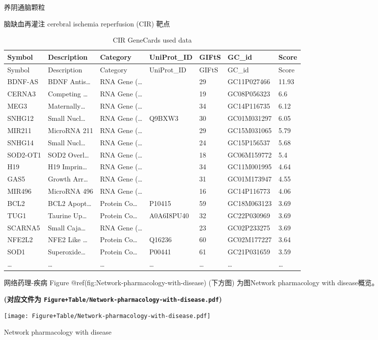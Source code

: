 \documentclass[
  ignorenonframetext,
]{beamer}
\begin{document}
\begin{frame}[fragile]{养阴通脑颗粒}
\begin{block}{脑缺血再灌注 cerebral ischemia reperfusion (CIR) 靶点}
\begin{longtable}[]{@{}lllllll@{}}
\caption{CIR GeneCards used data}\tabularnewline
\toprule
Symbol & Description & Category & UniProt\_ID & GIFtS & GC\_id &
Score\tabularnewline
\midrule
\endfirsthead
\toprule
Symbol & Description & Category & UniProt\_ID & GIFtS & GC\_id &
Score\tabularnewline
\midrule
\endhead
BDNF-AS & BDNF Antis\ldots{} & RNA Gene (\ldots{} & & 29 & GC11P027466 &
11.93\tabularnewline
CERNA3 & Competing \ldots{} & RNA Gene (\ldots{} & & 19 & GC08P056323 &
6.6\tabularnewline
MEG3 & Maternally\ldots{} & RNA Gene (\ldots{} & & 34 & GC14P116735 &
6.12\tabularnewline
SNHG12 & Small Nucl\ldots{} & RNA Gene (\ldots{} & Q9BXW3 & 30 &
GC01M031297 & 6.05\tabularnewline
MIR211 & MicroRNA 211 & RNA Gene (\ldots{} & & 29 & GC15M031065 &
5.79\tabularnewline
SNHG14 & Small Nucl\ldots{} & RNA Gene (\ldots{} & & 24 & GC15P156537 &
5.68\tabularnewline
SOD2-OT1 & SOD2 Overl\ldots{} & RNA Gene (\ldots{} & & 18 & GC06M159772
& 5.4\tabularnewline
H19 & H19 Imprin\ldots{} & RNA Gene (\ldots{} & & 34 & GC11M001995 &
4.64\tabularnewline
GAS5 & Growth Arr\ldots{} & RNA Gene (\ldots{} & & 31 & GC01M173947 &
4.55\tabularnewline
MIR496 & MicroRNA 496 & RNA Gene (\ldots{} & & 16 & GC14P116773 &
4.06\tabularnewline
BCL2 & BCL2 Apopt\ldots{} & Protein Co\ldots{} & P10415 & 59 &
GC18M063123 & 3.69\tabularnewline
TUG1 & Taurine Up\ldots{} & Protein Co\ldots{} & A0A6I8PU40 & 32 &
GC22P030969 & 3.69\tabularnewline
SCARNA5 & Small Caja\ldots{} & RNA Gene (\ldots{} & & 23 & GC02P233275 &
3.69\tabularnewline
NFE2L2 & NFE2 Like \ldots{} & Protein Co\ldots{} & Q16236 & 60 &
GC02M177227 & 3.64\tabularnewline
SOD1 & Superoxide\ldots{} & Protein Co\ldots{} & P00441 & 61 &
GC21P031659 & 3.59\tabularnewline
\ldots{} & \ldots{} & \ldots{} & \ldots{} & \ldots{} & \ldots{} &
\ldots{}\tabularnewline
\bottomrule
\end{longtable}
\end{block}

\begin{block}{网络药理-疾病}
\protect\hypertarget{ux7f51ux7edcux836fux7406-ux75beux75c5}{}
Figure @ref(fig:Network-pharmacology-with-disease) (下方图) 为图Network
pharmacology with disease概览。

\textbf{(对应文件为
\texttt{Figure+Table/Network-pharmacology-with-disease.pdf})}

\def\@captype{figure}
\begin{center}
\texttt{[image: Figure+Table/Network-pharmacology-with-disease.pdf]}
\caption{Network pharmacology with disease}\label{fig:Network-pharmacology-with-disease}
\end{center}


\end{block}
\end{frame}
\end{document}
